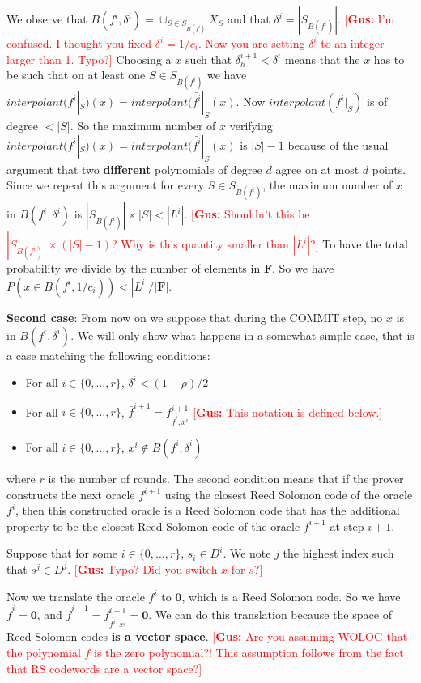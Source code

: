 \documentclass[12pt]{extarticle}
\newcommand{\<}{\langle}
\renewcommand{\>}{\rangle}
\theoremstyle{definition}
\newcommand{\gus}[1]{\textcolor{red}{[\textbf{Gus:} #1]}}
\begin{document}
We observe that $B(f^i,\delta^i)=\cup_{S\in S_{B(f^i)}}X_S$ and that $\delta^i=|S_{B(f^i)}|$.
\gus{I'm confused.  I thought you fixed $\delta^i=1/c_i$.  Now you are setting $\delta^i$ to an integer larger than 1.  Typo?}
Choosing a $x$ such that $\delta^{i+1}_h<\delta^i$ means that the $x$ has to be such that on at least one $S\in S_{B(f^i)}$ we have $interpolant(f^i|_S)(x)=interpolant(\bar{f^i}|_S(x)$. Now $interpolant(f^i|_S)$ is of degree $<|S|$. So the maximum number of $x$ verifying $interpolant(f^i|_S)(x)=interpolant(\bar{f^i}|_S(x)$ is $|S|-1$ because of the usual argument that two \textbf{different} polynomials of degree $d$ agree on at most $d$ points. Since we repeat this argument for every $S\in S_{B(f^i)}$, the maximum number of $x$ in $B(f^i,\delta^i)$ is $|S_{B(f^i)}|\times|S|<|L^i|$.
\gus{Shouldn't this be $|S_{B(f^i)}|\times(|S|-1)$?  Why is this quantity smaller than $|L^i|$?}
To have the total probability we divide by the number of elements in $\mathbf{F}$. So we have $P(x\in B(f^i,1/c_i))<|L^i|/|\mathbf{F}|$.

\textbf{Second case}: From now on we suppose that during the COMMIT step, no $x$ is in $B(f^i,\delta^i)$. We will only show what happens in a somewhat simple case, that is a case matching the following conditions:
\begin{itemize}
    \item For all $i\in\{0,\dots,r\}$, $\delta^i<(1-\rho)/2$
    \item For all $i\in\{0,\dots,r\}$, $\bar{f}^{i+1}=f^{i+1}_{\bar{f}^i,x^i}$ \gus{This notation is defined below.}
    \item For all $i\in\{0,\dots,r\}$, $x^i\not\in B(f^i,\delta^i)$
\end{itemize}
where $r$ is the number of rounds. The second condition means that if the prover constructs the next oracle $f^{i+1}$ using the closest Reed Solomon code of the oracle $f^i$, then this constructed oracle is a Reed Solomon code that has the additional property to be the closest Reed Solomon code of the oracle $f^{i+1}$ at step $i+1$.

Suppose that for some $i\in\{0,\dots,r\}$, $s_i\in D^i$. We note $j$ the highest index such that $s^j\in D^j$.
\gus{Typo?  Did you switch $x$ for $s$?}

Now we translate the oracle $f^i$ to $\mathbf{0}$, which is a Reed Solomon code. So we have $\bar{f}^i=\mathbf{0}$, and $\bar{f}^{i+1}=f^{i+1}_{\bar{f^i},x^i}=\mathbf{0}$. We can do this translation because the space of Reed Solomon codes \textbf{is a vector space}.
\gus{Are you assuming WOLOG that the polynomial $f$ is the zero polynomial?!  This assumption follows from the fact that RS codewords are a vector space?}
\end{document}
